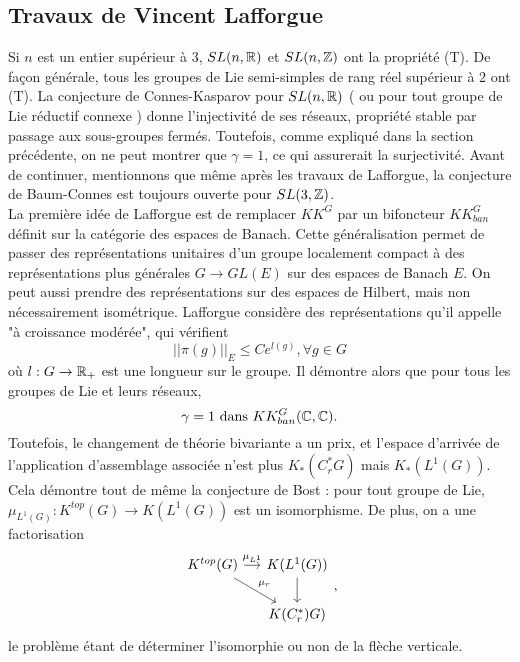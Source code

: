 \subsection{Travaux de Vincent Lafforgue}

Si $n$ est un entier supérieur à $3$, $SL(n,\mathbb R)$ et $SL(n,\mathbb Z)$ ont la propriété (T). De façon générale, tous les groupes de Lie semi-simples de rang réel supérieur à $2$ ont (T). La conjecture de Connes-Kasparov pour $SL(n,\mathbb R)$ ( ou pour tout groupe de Lie réductif connexe ) donne l'injectivité de ses réseaux, propriété stable par passage aux sous-groupes fermés. Toutefois, comme expliqué dans la section précédente, on ne peut montrer que $\gamma=1$, ce qui assurerait la surjectivité. Avant de continuer, mentionnons que même après les travaux de Lafforgue, la conjecture de Baum-Connes est toujours ouverte pour $SL(3,\mathbb Z)$.\\

La première idée de Lafforgue est de remplacer $KK^G$ par un bifoncteur $KK^G_{ban}$ définit sur la catégorie des espaces de Banach. Cette généralisation permet de passer des représentations unitaires d'un groupe localement compact à des représentations plus générales $G\rightarrow GL(E)$ sur des espaces de Banach $E$. On peut aussi prendre des représentations sur des espaces de Hilbert, mais non nécessairement isométrique. Lafforgue considère des représentations qu'il appelle "à croissance modérée", qui vérifient
\[||\pi(g)||_E \leq C e^{l(g)},\forall g\in G\]
où $l:G\rightarrow \mathbb R_+$ est une longueur sur le groupe. Il démontre alors que pour tous les groupes de Lie et leurs réseaux, 
\[\gamma = 1 \ \text{dans }KK^G_{ban}(\C,\C).\]
Toutefois, le changement de théorie bivariante a un prix, et l'espace d'arrivée de l'application d'assemblage associée n'est plus $K_*(C^*_rG)$ mais $K_*(L^1(G))$. Cela démontre tout de même la conjecture de Bost : pour tout groupe de Lie, $\mu_{L^1(G)} : K^{top}(G)\rightarrow K(L^1(G))$ est un isomorphisme. De plus, on a une factorisation 
\[\begin{tikzcd}[column sep = small]
K^{top}(G) \arrow{r}{\mu_{L^1}}\arrow{dr}{\mu_r} & K(L^1(G)) \arrow{d}\\
					& K(C^*_r)G)
\end{tikzcd},\]
le problème étant de déterminer l'isomorphie ou non de la flèche verticale.\\

